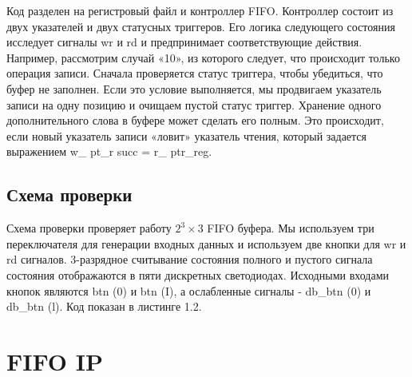 

Код разделен на регистровый файл и контроллер FIFO. Контроллер состоит из двух указателей и двух статусных триггеров. Его логика следующего состояния исследует сигналы wr и rd и предпринимает соответствующие действия. Например, рассмотрим случай «10», из которого следует, что происходит только операция записи. Сначала проверяется статус триггера, чтобы убедиться, что буфер не заполнен. Если это условие выполняется, мы продвигаем указатель записи на одну позицию и очищаем пустой статус триггер. Хранение одного дополнительного слова в буфере может сделать его полным. Это происходит, если новый указатель записи «ловит» указатель чтения, который задается выражением w\_ pt\_r succ = r\_ ptr\_reg.

\subsection{Схема проверки}

Схема проверки проверяет работу  $2^{3} \times 3$ FIFO буфера. Мы используем три переключателя для генерации входных данных и используем две кнопки для wr и rd сигналов. 3-разрядное считывание состояния полного и пустого сигнала состояния отображаются в пяти дискретных светодиодах. Исходными входами кнопок являются btn (0) и btn (I), а ослабленные сигналы - db\_btn (0) и db\_btn (l). Код показан в листинге 1.2.



\section{FIFO IP}

